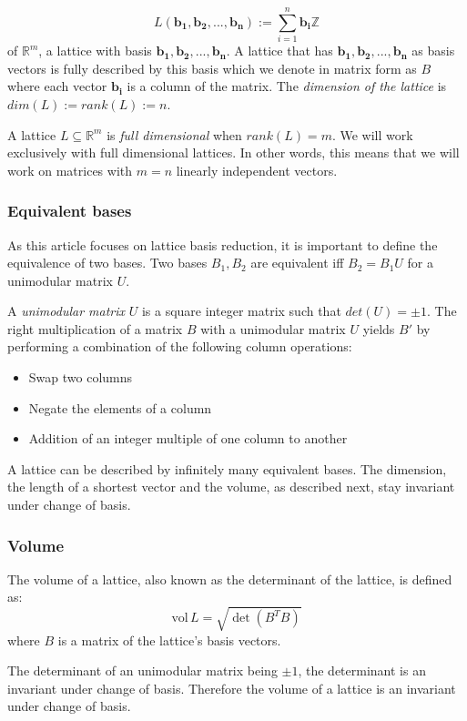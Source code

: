\documentclass[10pt, a4paper]{article}
\renewcommand{\vec}[1]{\mathbf{#1}}
\begin{document}
\[
L(\vec{b_1}, \vec{b_2},..., \vec{b_n}):= \displaystyle\sum_{i=1}^{n} \vec{b_i} \mathbb{Z}
\] of $\mathbb{R}^m$, a lattice with basis $\vec{b_1,b_2,...,b_n}$.
A lattice that has $\vec{b_1},\vec{b_2},...,\vec{b_n}$ as basis vectors is fully described by this basis which we denote in matrix form as $B$ where each vector $\vec{b_i}$ is a column of the matrix.
The \emph{dimension of the lattice} is $dim(L) := rank(L) := n$.

A lattice $L \subseteq \mathbb{R}^m$ is \emph{full dimensional} when $rank(L)=m$. We will work exclusively with full dimensional lattices. In other words, this means that we will work on matrices with $m=n$ linearly independent vectors.

\subsubsection{Equivalent bases}

As this article focuses on lattice basis reduction, it is important to define the equivalence of two bases. Two bases $B_1 , B_2$ are equivalent iff $B_2 = B_1 U$ for a unimodular matrix $U$.

A \emph{unimodular matrix} $U$ is a square integer matrix such that $det(U) = \pm 1$. The right multiplication of a matrix $B$ with a unimodular matrix $U$ yields $B'$ by performing a combination of the following column operations:
\begin{itemize}
\item Swap two columns
\item Negate the elements of a column
\item Addition of an integer multiple of one column to another
\end{itemize}

A lattice can be described by infinitely many equivalent bases. The dimension, the length of a shortest vector and the volume, as described next, stay invariant under change of basis.
\subsubsection{Volume}

The volume of a lattice, also known as the determinant of the lattice, is defined as:
\[
\text{vol} \,L = \sqrt{\det(B^T B)}
\] where $B$ is a matrix of the lattice's basis vectors.


The determinant of an unimodular matrix being $\pm 1$, the determinant is an invariant under change of basis. Therefore the volume of a lattice is an invariant under change of basis.
\end{document}
